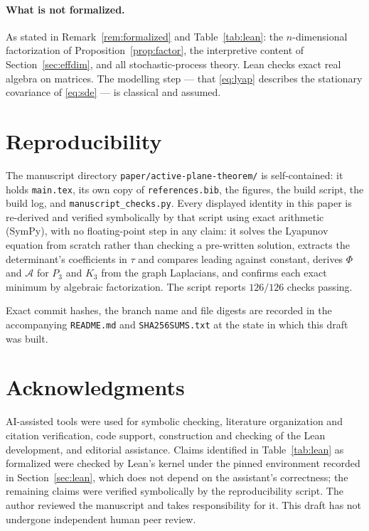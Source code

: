 \documentclass[11pt]{article}
\theoremstyle{plain}
\theoremstyle{definition}
\theoremstyle{remark}
\newcommand{\Aco}{\mathcal{A}}
\begin{document}
\paragraph{What is not formalized.} As stated in Remark~\ref{rem:formalized} and
Table~\ref{tab:lean}: the $n$-dimensional factorization of Proposition~\ref{prop:factor}, the
interpretive content of Section~\ref{sec:effdim}, and all stochastic-process theory. Lean checks
exact real algebra on matrices. The modelling step --- that \eqref{eq:lyap} describes the
stationary covariance of \eqref{eq:sde} --- is classical and assumed.

\section{Reproducibility}\label{sec:repro}

The manuscript directory \texttt{paper/active-plane-theorem/} is self-contained: it holds
\texttt{main.tex}, its own copy of \texttt{references.bib}, the figures, the build script, the
build log, and \texttt{manuscript\_checks.py}. Every displayed identity in this paper is
re-derived and verified symbolically by that script using exact arithmetic (SymPy), with no
floating-point step in any claim: it solves the Lyapunov equation from scratch rather than
checking a pre-written solution, extracts the determinant's coefficients in $\tau$ and compares
leading against constant, derives $\Phi$ and $\Aco$ for $P_3$ and $K_3$ from the graph
Laplacians, and confirms each exact minimum by algebraic factorization. The script reports
$126/126$ checks passing.

Exact commit hashes, the branch name and file digests are recorded in the accompanying
\texttt{README.md} and \texttt{SHA256SUMS.txt} at the state in which this draft was built.

\section*{Acknowledgments}

AI-assisted tools were used for symbolic checking, literature organization and citation
verification, code support, construction and checking of the Lean development, and editorial
assistance. Claims identified in Table~\ref{tab:lean} as formalized were checked by Lean's kernel
under the pinned environment recorded in Section~\ref{sec:lean}, which does not depend on the
assistant's correctness; the remaining claims were verified symbolically by the reproducibility
script. The author reviewed the manuscript and takes responsibility for it. This draft has not
undergone independent human peer review.
\end{document}
